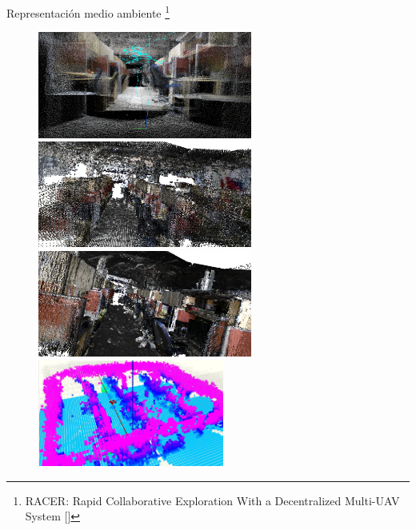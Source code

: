 \documentclass[24pt,aspectratio=169]{beamer}
\begin{document}
\begin{frame}{Representación medio ambiente \footnote{\tiny RACER: Rapid Collaborative Exploration With a Decentralized Multi-UAV System [\cite{RACER2022}]}}
  \begin{figure}[ht!]
    \centering
    \begin{minipage}{0.48\textwidth}
      \centering
      \includegraphics[width=\linewidth,height=3.5cm]{ROS_MAP2} %
    \end{minipage}\hfill
    \begin{minipage}{0.48\textwidth}
      \centering
      \includegraphics[width=\linewidth,height=3.5cm]{ROS_MAP3} %
    \end{minipage}
    \vspace{-0.2cm} %
    \begin{minipage}{0.48\textwidth}
      \centering
      \includegraphics[width=\linewidth,height=3.5cm]{ROS_MAP4} %
    \end{minipage}\hfill
    \begin{minipage}{0.48\textwidth}
      \centering
      \includegraphics[width=\linewidth,height=3.5cm]{ROS_MAP6} %
    \end{minipage}
  \end{figure}
  \bigskip %
\end{frame}
\end{document}
